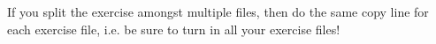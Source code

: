\documentclass{article}
\begin{document}
\begin{spacing}{1.0}
If you split the exercise amongst multiple files, then do the same copy line for each exercise file, i.e. be sure to turn in all your exercise files! 




\end{spacing}
\end{document}
